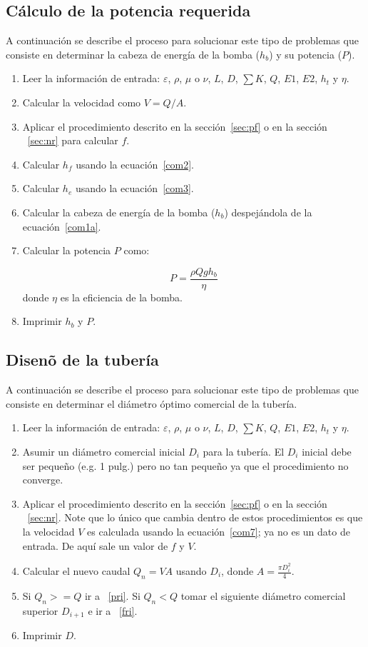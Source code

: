 \documentclass[10pt, oneside]{article}
\begin{document}
\subsection{C\'alculo de la potencia requerida}
A continuaci\'on se describe el proceso para solucionar este tipo de problemas que consiste en determinar la cabeza de energ\'ia de la bomba ($h_b$) y su potencia  ($P$).
\begin{enumerate} 
\item Leer la informaci\'on de entrada: $\varepsilon$, $\rho$, $\mu$ o $\nu$, $L$, $D$, $\sum K$, $Q$, $E1$, $E2$, $h_t$ y $\eta$.
\item Calcular la velocidad como $V=Q/A$.
\item Aplicar el procedimiento descrito en la secci\'on~\ref{sec:pf} o en la secci\'on ~\ref{sec:nr} para calcular $f$.
\item Calcular $h_f$ usando la ecuaci\'on~\ref{com2}.
\item Calcular $h_e$ usando la ecuaci\'on~\ref{com3}.
\item Calcular la cabeza de energ\'ia de la bomba ($h_b$) despej\'andola de la ecuaci\'on~\ref{com1a}.
\item Calcular la potencia $P$ como:

\begin{equation}
P = \frac{\rho Q g h_b}{\eta}
\label{com12a}
\end{equation}
donde $\eta$ es la eficiencia de la bomba.

\item Imprimir $h_b$ y $P$.
\end{enumerate} 

\subsection{Disen\~o de la  tuber\'ia}
A continuaci\'on se describe el proceso para solucionar este tipo de problemas que consiste en determinar el di\'ametro \'optimo comercial de la tuber\'ia.
\begin{enumerate} 
\item Leer la informaci\'on de entrada: $\varepsilon$, $\rho$, $\mu$ o $\nu$, $L$, $D$, $\sum K$, $Q$, $E1$, $E2$, $h_t$ y $\eta$.
\item Asumir un di\'ametro comercial inicial $D_i$ para la tuber\'ia. El $D_i$ inicial debe ser peque\~no (e.g. 1 pulg.) pero no tan peque\~no ya que el procedimiento no converge.
\item \label{fri} Aplicar el procedimiento descrito en la secci\'on~\ref{sec:pf} o en la secci\'on ~\ref{sec:nr}. Note que lo \'unico que cambia dentro de estos procedimientos es que la velocidad $V$ es calculada usando la ecuaci\'on~\ref{com7}; ya no es un dato de entrada. De aqu\'i sale un valor de $f$ y $V$.
\item Calcular el nuevo caudal $Q_n =VA$ usando $D_i$, donde $A=\frac{\pi D_i^2}{4}$.
\item Si $Q_n >= Q $ ir a ~\ref{pri}. Si $Q_n < Q$ tomar el siguiente di\'ametro comercial superior $D_{i+1}$ e ir a ~\ref{fri}.
\item \label{pri} Imprimir $D$.
\end{enumerate} 
\end{document}
